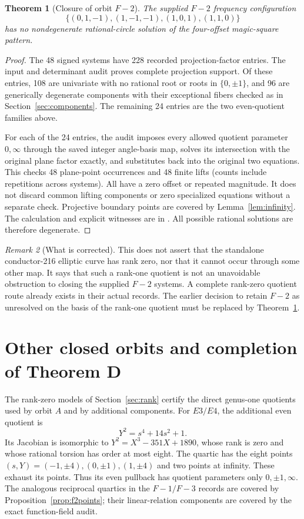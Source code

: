 \documentclass[11pt,letterpaper]{article}
\newtheorem{theorem}{Theorem}[section]
\theoremstyle{definition}\newtheorem{definition}[theorem]{Definition}
\theoremstyle{remark}\newtheorem{remark}[theorem]{Remark}
\begin{document}
\begin{theorem}[Closure of orbit $F{-}2$]\label{thm:F2}
The supplied $F{-}2$ frequency configuration
\[
\{(0,1,-1),(1,-1,-1),(1,0,1),(1,1,0)\}
\]
has no nondegenerate rational-circle solution of the four-offset magic-square pattern.
\end{theorem}
\begin{proof}
The 48 signed systems have 228 recorded projection-factor entries. The input and determinant audit proves complete projection support. Of these entries, 108 are univariate with no rational root or roots in $\{0,\pm1\}$, and 96 are generically degenerate components with their exceptional fibers checked as in Section~\ref{sec:components}. The remaining 24 entries are the two even-quotient families above.

For each of the 24 entries, the audit imposes every allowed quotient parameter $0,\infty$ through the saved integer angle-basis map, solves its intersection with the original plane factor exactly, and substitutes back into the original two equations. This checks 48 plane-point occurrences and 48 finite lifts (counts include repetitions across systems). All have a zero offset or repeated magnitude. It does not discard common lifting components or zero specialized equations without a separate check. Projective boundary points are covered by Lemma~\ref{lem:infinity}. The calculation and explicit witnesses are in . All possible rational solutions are therefore degenerate.
\end{proof}

\begin{remark}[What is corrected]
This does not assert that the standalone conductor-216 elliptic curve has rank zero, nor that it cannot occur through some other map. It says that such a rank-one quotient is not an unavoidable obstruction to closing the supplied $F{-}2$ systems. A complete rank-zero quotient route already exists in their actual records. The earlier decision to retain $F{-}2$ as unresolved on the basis of the rank-one quotient must be replaced by Theorem~\ref{thm:F2}.
\end{remark}

\section{Other closed orbits and completion of Theorem D}\label{sec:closed}
The rank-zero models of Section~\ref{sec:rank} certify the direct genus-one quotients used by orbit $A$ and by additional components. For $E3/E4$, the additional even quotient is
\[
Y^2=s^4+14s^2+1.
\]
Its Jacobian is isomorphic to $Y^2=X^3-351X+1890$, whose rank is zero and whose rational torsion has order at most eight. The quartic has the eight points $(s,Y)=(-1,\pm4),(0,\pm1),(1,\pm4)$ and two points at infinity. These exhaust its points. Thus its even pullback has quotient parameters only $0,\pm1,\infty$. The analogous reciprocal quartics in the $F{-}1/F{-}3$ records are covered by Proposition~\ref{prop:f2points}; their linear-relation components are covered by the exact function-field audit.
\end{document}
